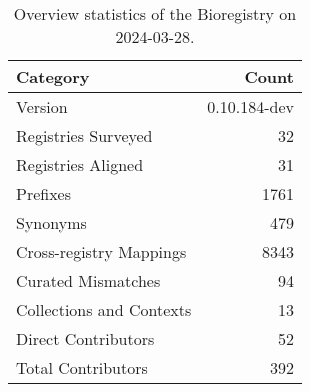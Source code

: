 \begin{table}
\caption{Overview statistics of the Bioregistry on 2024-03-28.}
\label{tab:bioregistry-summary}
\begin{tabular}{lr}
\toprule
Category & Count \\
\midrule
Version & 0.10.184-dev \\
Registries Surveyed & 32 \\
Registries Aligned & 31 \\
Prefixes & 1761 \\
Synonyms & 479 \\
Cross-registry Mappings & 8343 \\
Curated Mismatches & 94 \\
Collections and Contexts & 13 \\
Direct Contributors & 52 \\
Total Contributors & 392 \\
\bottomrule
\end{tabular}
\end{table}
